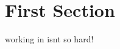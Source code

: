 \documentclass{article}
\begin{document}


\section*{First Section}
working in isnt so hard!
\end{document}
